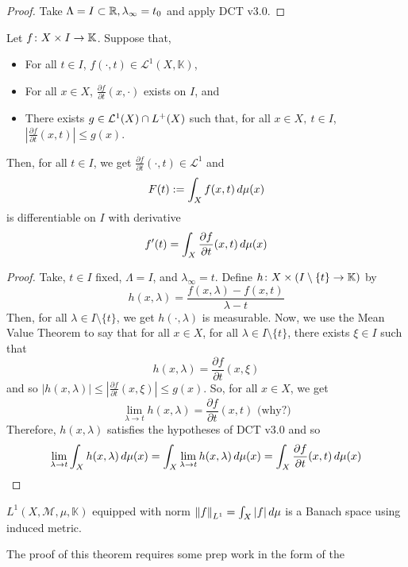 \documentclass[11pt,leqno,oneside]{amsbook}
\numberwithin{thm}{section}
\newcommand{\M}{\mathcal{M}}
\newcommand{\cL}{\mathcal{L}}
\newcommand{\K}{\mathbb{K}} %
\begin{document}
\begin{proof}
  Take \(\Lambda = I \subset \R, \lambda_\infty = t_0\) and apply DCT
  v3.0.
\end{proof}
\begin{cor}
  Let \(f \from X \times I \to \K\). Suppose that,
  \begin{itemize}
  \item For all \(t \in  I\), \(f(\cdot, t) \in \cL^1(X,\K)\),
  \item For all \(x \in X\), \(\frac{\partial f}{\partial
      t}(x,\cdot)\) exists on \(I\), and
  \item There exists \(g \in \cL^1(X) \intersect L^+(X)\) such that,
    for all \(x \in X,\ t \in I\), \(\left| \frac{\partial f}{\partial
      t}(x,t)\right| \leq g(x)\).
  \end{itemize}
  Then, for all \(t \in I\), we get \(\frac{\partial f}{\partial
    t}(\cdot, t) \in \cL^1\)  and \[
    F(t) := \int_X f(x,t) \d\mu(x)
  \]
  is differentiable on \(I\) with derivative \[
    f'(t) = \int_X \frac{\partial f}{\partial t}(x,t) \d\mu(x)
  \]
\end{cor}
\begin{proof}
  Take, \(t \in I\) fixed, \(\Lambda = I\), and \(\lambda_\infty =
  t\). Define \(h \from X \times (I \setminus \{t\} \to \K)\) by
  \[h(x,\lambda) = \frac{f(x,\lambda) - f(x,t)}{\lambda - t}\]
  Then, for all \(\lambda \in I \setminus \{t\}\), we get \(h(\cdot,
  \lambda)\) is measurable. Now, we use the Mean Value Theorem to say
  that for all \(x \in X\), for all \(\lambda \in I \setminus \{t\}\),
  there exists \(\xi \in I\) such that \[
    h(x,\lambda) = \frac{\partial f}{\partial t}(x, \xi)
  \]
  and so \(|h(x,\lambda)| \leq \left| \frac{\partial f}{\partial
      t}(x,\xi) \right| \leq g(x)\). So, for all \(x \in X\), we
  get \[
    \lim_{\lambda \to t} h(x,\lambda) = \frac{\partial f}{\partial
      t}(x,t) \text{ (why?)}
  \]
  Therefore, \(h(x,\lambda)\) satisfies the hypotheses of DCT v3.0 and
  so \[
    \lim_{\lambda \to t} \int_X h(x,\lambda) \d \mu(x) = \int_X
    \lim_{\lambda \to t} h(x,\lambda) \d\mu(x) = \int_X \frac{\partial
      f}{\partial t}(x,t) \d\mu(x)
  \]
\end{proof}
\begin{thm}
  \(L^1(X,\M,\mu,\K)\) equipped with norm \(\norm[f]_{L^1} = \int_X
  |f|\d\mu\) is a Banach space using induced metric.
\end{thm}
The proof of this theorem requires some prep work in the form of the
\end{document}
